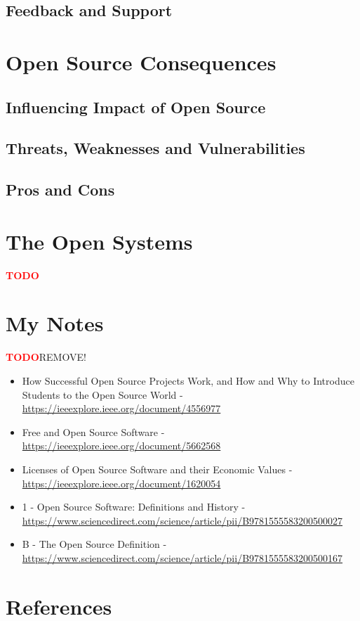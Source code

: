 \documentclass[11pt,a4paper]{article}
\newcommand{\TODO}{\textbf{\textcolor{red}{TODO}}} %
\theoremstyle{definition}
\begin{document}
    \subsection{Feedback and Support}

\section{Open Source Consequences}

    \subsection{Influencing Impact of Open Source}

    \subsection{Threats, Weaknesses and Vulnerabilities}

    \subsection{Pros and Cons}

\section{The Open Systems}

    \TODO

\section{My Notes}

    \TODO REMOVE!

    \begin{itemize}
      \item How Successful Open Source Projects Work, and How and Why to Introduce Students to the Open Source World - \url{https://ieeexplore.ieee.org/document/4556977}
      \item Free and Open Source Software - \url{https://ieeexplore.ieee.org/document/5662568}
      \item Licenses of Open Source Software and their Economic Values - \url{https://ieeexplore.ieee.org/document/1620054}
      \item 1 - Open Source Software: Definitions and History - \url{https://www.sciencedirect.com/science/article/pii/B9781555583200500027}
      \item B - The Open Source Definition - \url{https://www.sciencedirect.com/science/article/pii/B9781555583200500167}
    \end{itemize}

\newpage

\section{References}

\begin{flushleft}
    
\end{flushleft}
\end{document}
